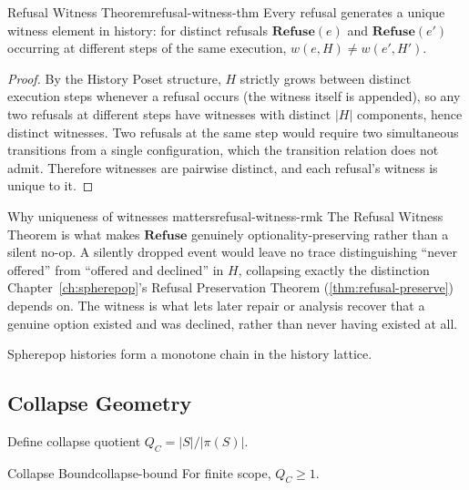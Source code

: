 \documentclass[12pt,twoside,openright]{book}
\begin{document}
\begin{theorem}{Refusal Witness Theorem}{refusal-witness-thm}
  Every refusal generates a unique witness element in
  history: for distinct refusals
  $\mathbf{Refuse}(e)$ and $\mathbf{Refuse}(e')$
  occurring at different steps of the same execution,
  $w(e, H) \ne w(e', H')$.
\end{theorem}

\begin{proof}
  By the History Poset structure, $H$ strictly grows
  between distinct execution steps whenever a refusal
  occurs (the witness itself is appended), so any two
  refusals at different steps have witnesses with distinct
  $|H|$ components, hence distinct witnesses. Two refusals
  at the same step would require two simultaneous
  transitions from a single configuration, which the
  transition relation does not admit. Therefore witnesses
  are pairwise distinct, and each refusal's witness is
  unique to it.
\end{proof}

\begin{remark}{Why uniqueness of witnesses matters}{refusal-witness-rmk}
  The Refusal Witness Theorem is what makes
  $\mathbf{Refuse}$ genuinely optionality-preserving rather
  than a silent no-op. A silently dropped event would leave
  no trace distinguishing ``never offered'' from
  ``offered and declined'' in $H$, collapsing exactly the
  distinction Chapter~\ref{ch:spherepop}'s Refusal
  Preservation Theorem (\cref{thm:refusal-preserve}) depends
  on. The witness is what lets later repair or analysis
  recover that a genuine option existed and was declined,
  rather than never having existed at all.
\end{remark}

\begin{corollary}
Spherepop histories form a monotone chain in the history
lattice.
\end{corollary}

\subsection{Collapse Geometry}
\label{sec:app-collapse-geometry}

Define collapse quotient $Q_C = |S| / |\pi(S)|$.

\begin{theorem}{Collapse Bound}{collapse-bound}
  For finite scope, $Q_C \ge 1$.
\end{theorem}
\end{document}
